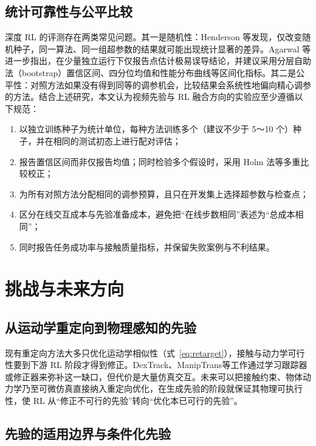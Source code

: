 \documentclass[UTF8,a4paper,zihao=-4]{ctexart}
\begin{document}
\subsection{统计可靠性与公平比较}

深度 RL 的评测存在两类常见问题。其一是随机性：Henderson 等\cite{henderson2018}发现，仅改变随机种子，同一算法、同一组超参数的结果就可能出现统计显著的差异。Agarwal 等\cite{agarwal2021}进一步指出，在少量独立运行下仅报告点估计极易误导结论，并建议采用分层自助法（bootstrap）置信区间\cite{efron1993}、四分位均值和性能分布曲线等区间化指标。其二是公平性：对照方法如果没有得到同等的调参机会，比较结果会系统性地偏向精心调参的方法\cite{henderson2018}。结合上述研究，本文认为视频先验与 RL 融合方向的实验应至少遵循以下规范：
\begin{enumerate}
  \item 以独立训练种子为统计单位，每种方法训练多个（建议不少于 5～10 个）种子，并在相同的测试初态上进行配对评估；
  \item 报告置信区间而非仅报告均值；同时检验多个假设时，采用 Holm 法等多重比较校正\cite{holm1979}；
  \item 为所有对照方法分配相同的调参预算，且只在开发集上选择超参数与检查点；
  \item 区分在线交互成本与先验准备成本，避免把“在线步数相同”表述为“总成本相同”；
  \item 同时报告任务成功率与接触质量指标，并保留失败案例与不利结果。
\end{enumerate}

\section{挑战与未来方向}\label{sec:future}

\subsection{从运动学重定向到物理感知的先验}

现有重定向方法大多只优化运动学相似性（式~\eqref{eq:retarget}），接触与动力学可行性要到下游 RL 阶段才得到修正。DexTrack\cite{dextrack}、ManipTrans\cite{maniptrans}等工作通过学习跟踪器或修正器来弥补这一缺口，但代价是大量仿真交互。未来可以把接触约束、物体动力学乃至可微仿真\cite{brax}直接纳入重定向优化，在生成先验的阶段就保证其物理可执行性，使 RL 从“修正不可行的先验”转向“优化本已可行的先验”。

\subsection{先验的适用边界与条件化先验}
\end{document}
